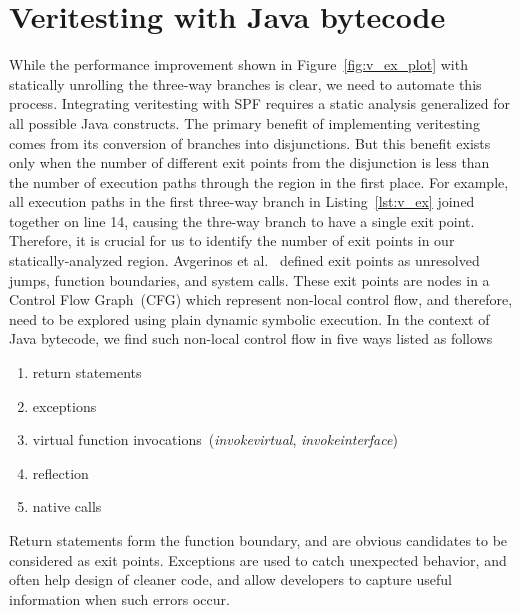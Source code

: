 \section{Veritesting with Java bytecode}
%
%
%

While the performance improvement shown in Figure~\ref{fig:v_ex_plot} with statically unrolling the three-way branches is clear, we need to automate this process.
%
Integrating veritesting with SPF requires a static analysis generalized for all possible Java constructs.
%
The primary benefit of implementing veritesting comes from its conversion of branches into disjunctions.
%
But this benefit exists only when the number of different exit points from the disjunction is less than the number of execution paths through the region in the first place.
%
For example, all execution paths in the first three-way branch in Listing~\ref{lst:v_ex} joined together on line 14, causing the thre-way branch to have a single exit point.
%
Therefore, it is crucial for us to identify the number of exit points in our statically-analyzed region.
%
Avgerinos et al.~\cite{veritesting} defined exit points as unresolved jumps, function boundaries, and system calls.
%
These exit points are nodes in a Control Flow Graph~(CFG) which represent non-local control flow, and therefore, need to be explored using plain dynamic symbolic execution.
%
In the context of Java bytecode, we find such non-local control flow in five ways listed as follows
%
\begin{enumerate}
\item return statements
\item exceptions
\item virtual function invocations~(\textit{invokevirtual}, \textit{invokeinterface})
\item reflection 
\item native calls
\end{enumerate}
%
Return statements form the function boundary, and are obvious candidates to be considered as exit points.
%
Exceptions are used to catch unexpected behavior, and often help design of cleaner code, and allow developers to capture useful information when such errors occur.
